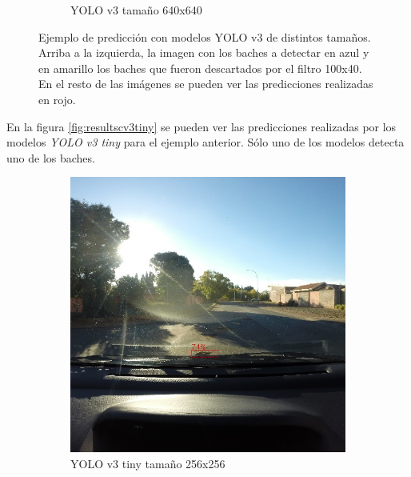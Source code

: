 \begin{figure}[H]
\begin{subfigure}[h]{0.45\linewidth}
		\caption{YOLO v3 tamaño 640x640}
	\end{subfigure}
	\caption{Ejemplo de predicción con modelos YOLO v3 de distintos tamaños. Arriba a la izquierda, la imagen con los baches a detectar en azul y en amarillo los baches que fueron descartados por el filtro 100x40. En el resto de las imágenes se pueden ver las predicciones realizadas en rojo.}
	\label{fig:resultscv3}
\end{figure}

En la figura \ref{fig:resultscv3tiny} se pueden ver las predicciones realizadas por los modelos \textit{YOLO v3 tiny} para el ejemplo anterior. Sólo uno de los modelos detecta uno de los baches.

\begin{figure}[H]
	\centering
	\begin{subfigure}[h]{0.45\linewidth}
		\includegraphics[width=\linewidth]{images/results_c_yolo_v3_tiny_256.jpg}
		\caption{YOLO v3 tiny tamaño 256x256}
	\end{subfigure}
	\begin{subfigure}[h]{0.45\linewidth}

\end{subfigure}
\end{figure}
